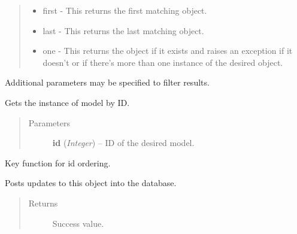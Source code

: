 \documentclass[letterpaper,10pt,english]{sphinxmanual}
\begin{document}
\begin{fulllineitems}
\begin{fulllineitems}
\begin{quote}
\begin{description}
\begin{description}
\begin{itemize}
\item {} 
first - This returns the first matching object.

\item {} 
last - This returns the last matching object.

\item {} 
one - This returns the object if it exists and raises an                exception if it doesn't or if there's more than one instance                of the desired object.

\end{itemize}

\end{description}


\end{description}\end{quote}

Additional parameters may be specified to filter results.

\end{fulllineitems}


\begin{fulllineitems}
\label{modelsbase:modelsbase.MethodMixin.get_by_id}
Gets the instance of model by ID.
\begin{quote}\begin{description}
\item[{Parameters}] \leavevmode
\textbf{id} (\emph{Integer}) -- ID of the desired model.

\end{description}\end{quote}

\end{fulllineitems}


\begin{fulllineitems}
\label{modelsbase:modelsbase.MethodMixin.id_ordering}
Key function for id ordering.

\end{fulllineitems}


\begin{fulllineitems}
\label{modelsbase:modelsbase.MethodMixin.update}
Posts updates to this object into the database.
\begin{quote}\begin{description}
\item[{Returns}] \leavevmode
Success value.


\end{description}
\end{quote}
\end{fulllineitems}
\end{fulllineitems}
\end{document}
